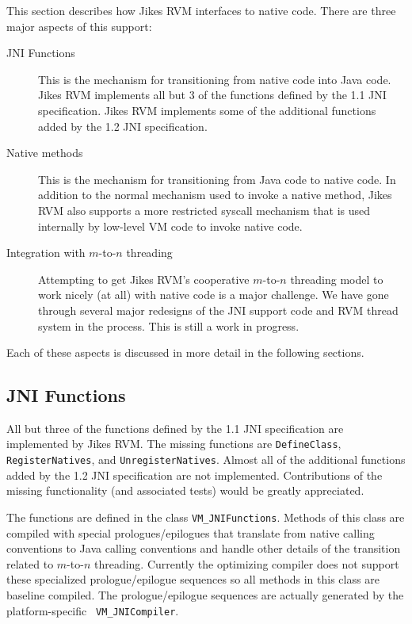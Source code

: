 %

This section describes how Jikes RVM interfaces to native code. There
are three major aspects of this support:
\begin{description}
\item[JNI Functions] This is the mechanism for transitioning from
native code into Java code.  Jikes RVM implements all but 3 of the
functions defined by the 1.1 JNI specification. Jikes RVM implements
some of the additional functions added by the 1.2 JNI
specification.
\item[Native methods] This is the mechanism for transitioning from
Java code to native code. In addition to the normal mechanism used to
invoke a native method, Jikes RVM also supports a more restricted
syscall mechanism that is used internally by low-level VM code to
invoke native code. 
\item[Integration with $m$-to-$n$ threading] Attempting to get Jikes RVM's
cooperative $m$-to-$n$ threading model to work nicely (at all) with native
code is a major challenge. We have gone through several major
redesigns of the JNI support code and RVM thread system in the
process. This is still a work in progress.
\end{description}
Each of these aspects is discussed in more detail in the following
sections. 

\subsection{JNI Functions}
All but three of the functions defined by the 1.1 JNI specification are
implemented by Jikes RVM. The missing functions are {\tt DefineClass},
{\tt RegisterNatives}, and {\tt UnregisterNatives}.  Almost all of the
additional functions added by the 1.2 JNI specification are not
implemented.  Contributions of the missing functionality (and
associated tests) would be greatly appreciated. 

The functions are defined in the class {\tt VM\_JNIFunctions}. Methods
of this class are compiled with special prologues/epilogues that
translate from native calling conventions to Java calling conventions
and handle other details of the transition related to $m$-to-$n$
threading.  Currently the optimizing compiler 
does not support these specialized prologue/epilogue sequences so all
methods in this class are baseline compiled.  The prologue/epilogue
sequences are actually generated by the platform-specific {\tt
VM\_JNICompiler}. 

